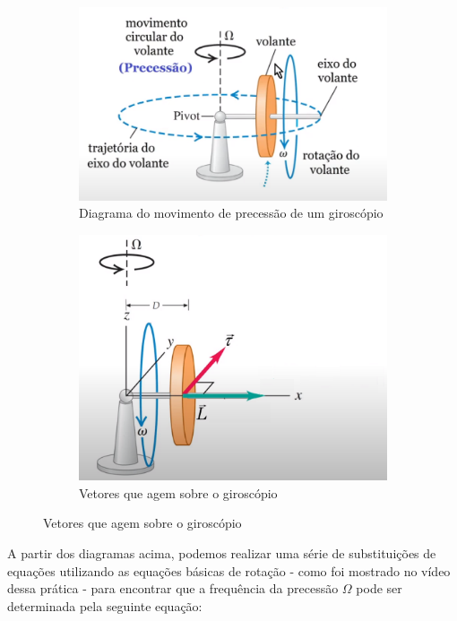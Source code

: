 \begin{figure}[H]
  \centering
    \begin{subfigure}[b]{0.48\textwidth}
        \centering
        \includegraphics[width=\textwidth]{images/movimento-giroscopio.png}
        \caption{Diagrama do movimento de precessão de um giroscópio}
    \end{subfigure}
    \hfill
    \begin{subfigure}[b]{0.48\textwidth}
        \centering
        \includegraphics[width=\textwidth]{images/propriedades-giroscopio.png}
        \caption{Vetores que agem sobre o giroscópio}
    \end{subfigure}
\end{figure}

A partir dos diagramas acima, podemos realizar uma série de substituições de equações utilizando as equações básicas de rotação - como foi mostrado no vídeo dessa prática - para encontrar que a frequência da precessão $\Omega$ pode ser determinada pela seguinte equação:

